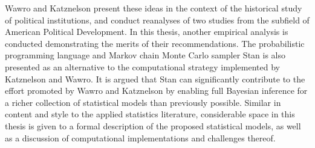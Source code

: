 Wawro and Katznelson present these ideas in the context of the historical study of political 
institutions, and conduct reanalyses of two studies from the subfield of American Political 
Development. In this thesis, another empirical analysis is conducted demonstrating the merits 
of their recommendations. The probabilistic programming language and Markov chain Monte Carlo 
sampler Stan is also presented as an alternative to the computational strategy 
implemented by Katznelson and Wawro. It is argued that Stan can significantly contribute to 
the effort promoted by Wawro and Katznelson by enabling full Bayesian inference for a richer
collection of statistical models than previously possible. Similar in content and style to the applied 
statistics literature, considerable space in this thesis is given to a formal description of the proposed 
statistical models, as well as a discussion of computational implementations and challenges thereof. 



%



